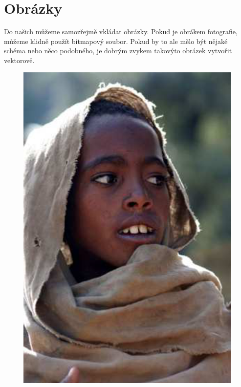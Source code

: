 \documentclass[11pt,a4paper]{article}
\begin{document}
\section{Obrázky}

Do našich  můžeme samozřejmě vkládat obrázky. Pokud je obrákem fotografie, můžeme klidně použít bitmapový soubor. Pokud by to ale mělo být nějaké schéma nebo něco podobného, je dobrým zvykem takovýto obrázek vytvořit vektorově.


\begin{figure}[htb]
 	\centering
 		\includegraphics[scale=0.43]{etiopan.eps}

\end{figure}
\end{document}
